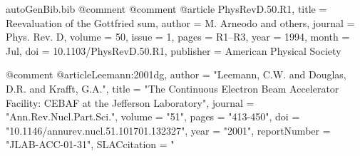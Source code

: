 \begin{filecontents*}{autoGenBib.bib}
@comment %
@comment %
@article{ PhysRevD.50.R1,
  title = {Reevaluation of the Gottfried sum},
  author = {M. Arneodo and others},
  journal = {Phys. Rev. D},
  volume = {50},
  issue = {1},
  pages = {R1--R3},
  year = {1994},
  month = {Jul},
  doi = {10.1103/PhysRevD.50.R1},
  publisher = {American Physical Society}
}

@comment %
@article{Leemann:2001dg,
      author         = "Leemann, C.W. and Douglas, D.R. and Krafft, G.A.",
      title          = "{The Continuous Electron Beam Accelerator Facility: CEBAF
                        at the Jefferson Laboratory}",
      journal        = "Ann.Rev.Nucl.Part.Sci.",
      volume         = "51",
      pages          = "413-450",
      doi            = "10.1146/annurev.nucl.51.101701.132327",
      year           = "2001",
      reportNumber   = "JLAB-ACC-01-31",
      SLACcitation   = "%
}


\end{filecontents*}
